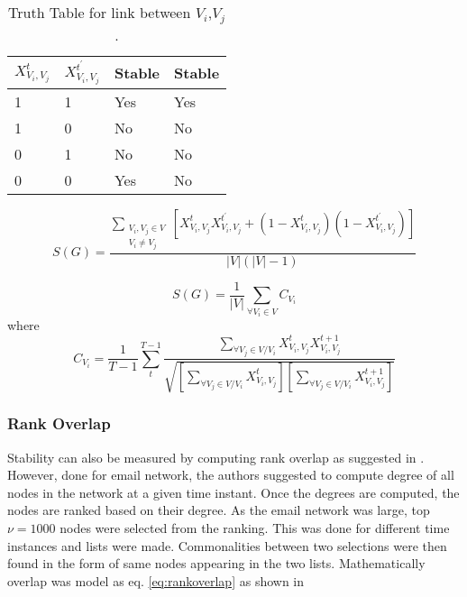 \documentclass[preprint, twocolumn,5p]{elsarticle}
\begin{document}
        \begin{table}
            \centering
            \begin{tabular}{|l|l|l|l|}
                \hline
                \textbf{$X_{V_{i},V_{j}}^{t}$} & \textbf{$X_{V_{i},V_{j}}^{t^{'}}$} & \textbf{Stable \cite{Hanneke2010}}& \textbf{Stable \cite{Tang2010}}\\
                \hline
                1&1&Yes&Yes\\
                1&0&No&No\\
                0&1&No&No\\
                0&0&Yes&No\\
                \hline
            \end{tabular}
            \caption{Truth Table for link between $V_{i}$,$V_{j}$.}
            \label{table:possiblinkxing}
        \end{table}

        \begin {equation}\label{eq:SXing}
        S(G)=\frac{\sum \limits _{\substack{V_{i},V_{j}\in V\\ V_{i}\neq V_{j}}} \left[X_{V_{i},V_{j}}^{t}X_{V_{i},V_{j}}^{t^{'}}+(1-X_{V_{i},V_{j}}^{t})(1-X_{V_{i},V_{j}}^{t^{'}})\right]}{|V|(|V|-1)}
        \end{equation}

        \begin {equation}\label{eq:SMascolo}
        S(G)=\frac{1}{|V|}\sum \limits _{\forall V_{i}\in V}C_{V_{i}}
        \end{equation}
        where
        \begin {equation}\label{eq:SMascolo2}
        C_{V_{i}}=\frac{1}{T-1}\sum \limits _{t}^{T-1}\frac{\sum \limits _{\forall V_{j}\in V/V_{i}}X_{V_{i},V_{j}}^{t}
        X_{V_{i},V_{j}}^{t+1}}{\sqrt{\left[\sum \limits _{\forall V_{j}\in V/V_{i}}X_{V_{i},V_{j}}^{t}\right]\left[\sum \limits _{\forall V_{j}\in V/V_{i}}X_{V_{i},V_{j}}^{t+1}\right]}}
        \end{equation}

        \subsubsection{Rank Overlap}\label{subsubsec:rankoverlap}
        Stability can also be measured by computing rank overlap as suggested in \cite{Braha2006, Braha2009}. However, done for email network, the authors suggested to compute degree of all nodes in the network at a given time instant. Once the degrees are computed, the nodes are ranked based on their degree. As the email network was large, top $\nu=1000$ nodes were selected from the ranking. This was done for different time instances and lists were made. Commonalities between two selections were then found in the form of same nodes appearing in the two lists. Mathematically overlap was model as eq. \ref{eq:rankoverlap} as shown in \cite{Hill2010}
\end{document}
